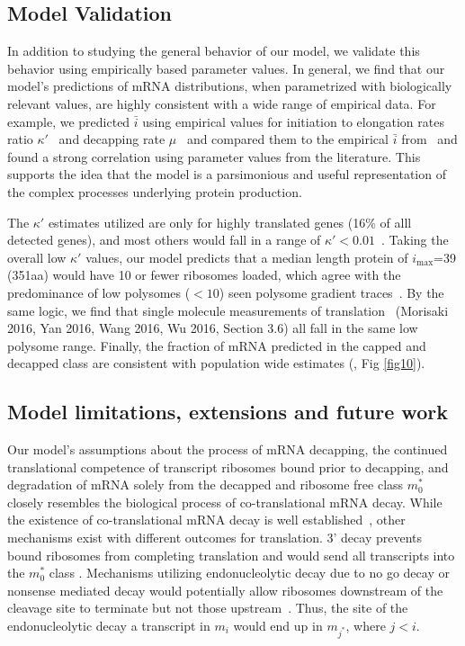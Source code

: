 \documentclass[10pt,letterpaper]{article}
\newcommand{\imax}{\ensuremath{{i_{\max}}}\xspace}
\newcommand{\MRL}{\ensuremath{\bar{i}}\xspace}
\begin{document}
\subsection*{Model Validation}

In addition to studying the general behavior of our model, we validate this behavior using empirically based parameter values.
In general, we find that our model's predictions of mRNA distributions, when parametrized with biologically relevant values, are highly consistent with a wide range of empirical data.
For example, we predicted \MRL using empirical values for initiation to elongation rates ratio $\kappa'$~\cite{RN13} and decapping rate $\mu$~\cite{RN27} and compared them to the empirical \MRL from~\cite{RN29} and found a strong correlation using parameter values from the literature.
This supports the idea that the model is a parsimonious and useful representation of the complex processes underlying protein production.

The $\kappa'$ estimates utilized are only for highly translated genes (16\% of alll detected genes), and most others would fall in a range of $\kappa'<0.01$~\cite{RN13}.
Taking the overall low $\kappa'$ values, our model predicts that a median length protein of \imax =39 (351aa) would have 10 or fewer ribosomes loaded, which agree with the predominance of low polysomes ($<10$) seen polysome gradient traces~\cite{RN35, RN36}. 
By the same logic, we find that single molecule measurements of translation~\cite{RN30,RN32,RN33,RN31} (Morisaki 2016, Yan 2016, Wang 2016, Wu 2016, Section 3.6) all fall in the same low polysome range.
Finally, the fraction of mRNA predicted in the capped and decapped class  are consistent with population wide estimates (\cite{RN4}, Fig \ref{fig10}). 


\subsection*{Model limitations, extensions and future work}

Our model's assumptions about the process of mRNA decapping, the continued translational competence of transcript ribosomes bound prior to decapping, and degradation of mRNA solely from the decapped and ribosome free class $m_0^*$  closely resembles the biological process of co-translational mRNA decay.
While the existence of co-translational mRNA decay is well established~\cite{RN4,RN28}, other mechanisms exist with different outcomes for translation. 3' decay prevents bound ribosomes from completing translation and would send all transcripts into the $m_0^*$ class .
Mechanisms utilizing endonucleolytic decay due to no go decay or nonsense mediated decay would potentially allow ribosomes downstream of the cleavage site to terminate but not those upstream~\cite{RN38,RN2}.
Thus,  the site of the endonucleolytic decay a transcript in $m_i$ would end up in $m_{j^*}$, where $j < i$.
\end{document}
